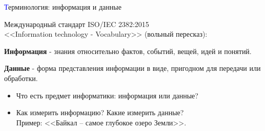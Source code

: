 
\begin{frame}[t]{\large \textcolor{blue}{Т}ерминология: информация и данные}
	
	\noindent Международный стандарт ISO/IEC 2382:2015 \\	
	\noindent <<Information technology - Vocabulary>> (вольный пересказ): \\

	\begin{list}{}
		{
			\setlength{\leftmargin}{12mm}
			\setlength{\itemsep}{0pt}
			\setlength{\parsep}{0pt}
		}
		\item \color[rgb]{0,0.7,0.4} \textbf{Информация} \color{black} - знания относительно фактов, событий, вещей, идей и понятий.
		\item \color[rgb]{0,0.7,0.4} \textbf{Данные} \color{black} - форма представления информации в виде, пригодном для передачи или обработки.
	\end{list}
	
	\vspace{4mm}
	
	\begin{itemize}
		\item Что есть предмет информатики: информация или данные?
		\item Как измерить информацию? Какие измерить данные? \\ Пример: <<Байкал -- самое глубокое озеро Земли>>.
	\end{itemize}
\end{frame}
